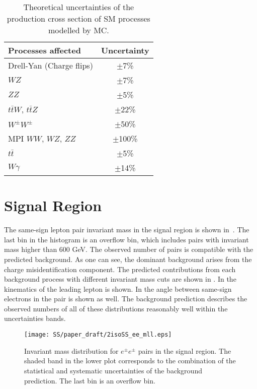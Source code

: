 \begin{table}[ht]
\begin{center}
\begin{tabular}{l|c}
Processes affected & Uncertainty \\
\hline
 Drell-Yan (Charge flips) & $\pm$7\% \\
 $WZ$ & $\pm$7\% \\
 $ZZ$ & $\pm$5\% \\
 $t\bar{t}W$, $t\bar{t}Z$  & $\pm$22\% \\
 $W^{\pm}W^{\pm}$ & $\pm$50\% \\
 MPI $WW$, $WZ$, $ZZ$ & $\pm$100\% \\
 $t\bar{t}$ & $\pm$5\% \\
 $W\gamma$ & $\pm$14\% \\
\end{tabular}
\end{center}
\caption{Theoretical uncertainties of the production cross section of SM processes modelled by MC.}
\label{tab:systematics_common}
\end{table}



\section{Signal Region}
\label{sec:ss_signalRegion}

The same-sign lepton pair invariant mass in the signal region is shown in~.
The last bin in the histogram is an overflow bin, which includes pairs with invariant mass higher than 600 GeV.
The observed number of pairs is compatible with the predicted background.
As one can see, the dominant background arises from the charge misidentification component.
The predicted contributions from each background process with different invariant mass cuts are shown in .
In  the kinematics of the leading lepton is shown. 
In  the angle between same-sign electrons in the pair is shown as well.
The background prediction describes the observed numbers of all of these distributions reasonably well within the uncertainties bands.

\begin{figure}[h]
\begin{center}
\texttt{[image: SS/paper\_draft/2isoSS\_ee\_mll.eps]}
\caption{Invariant mass distribution for $e^{\pm}e^{\pm}$ pairs in the signal region. 
The shaded band in the lower plot corresponds to the combination of the statistical and systematic uncertainties of the background prediction.
The last bin is an overflow bin.}
\label{fig:signal_mass}
\end{center}
\end{figure}

